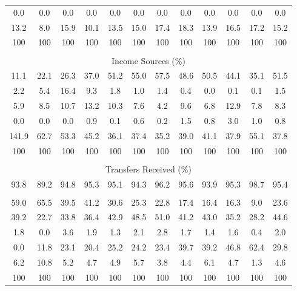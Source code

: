\begin{tabular}{c c c| c c c c c| c c c| c}
0.0 & 0.0 & 0.0 & 0.0 & 0.0 & 0.0 & 0.0 & 0.0 & 0.0 & 0.0 & 0.0 & 0.0 \\
13.2 & 8.0 & 15.9 & 10.1 & 13.5 & 15.0 & 17.4 & 18.3 & 13.9 & 16.5 & 17.2 & 15.2 \\
\midrule
100 & 100 & 100 & 100 & 100 & 100 & 100 & 100 & 100 & 100 & 100 & 100 \\
\midrule \\
\multicolumn{12}{c}{Income Sources (\%)}  \\
\midrule
11.1 & 22.1 & 26.3 & 37.0 & 51.2 & 55.0 & 57.5 & 48.6 & 50.5 & 44.1 & 35.1 & 51.5 \\
2.2 & 5.4 & 16.4 & 9.3 & 1.8 & 1.0 & 1.4 & 0.4 & 0.0 & 0.1 & 0.1 & 1.5 \\
5.9 & 8.5 & 10.7 & 13.2 & 10.3 & 7.6 & 4.2 & 9.6 & 6.8 & 12.9 & 7.8 & 8.3 \\
0.0 & 0.0 & 0.0 & 0.9 & 0.1 & 0.6 & 0.2 & 1.5 & 0.8 & 3.0 & 1.0 & 0.8 \\
141.9 & 62.7 & 53.3 & 45.2 & 36.1 & 37.4 & 35.2 & 39.0 & 41.1 & 37.9 & 55.1 & 37.8 \\
\midrule
100 & 100 & 100 & 100 & 100 & 100 & 100 & 100 & 100 & 100 & 100 & 100 \\
\midrule \\
\multicolumn{12}{c}{Transfers Received (\%)}  \\
\midrule
93.8 & 89.2 & 94.8 & 95.3 & 95.1 & 94.3 & 96.2 & 95.6 & 93.9 & 95.3 & 98.7 & 95.4 \\
 & & & & & & & & & & &  \\
59.0 & 65.5 & 39.5 & 41.2 & 30.6 & 25.3 & 22.8 & 17.4 & 16.4 & 16.3 & 9.0 & 23.6 \\
39.2 & 22.7 & 33.8 & 36.4 & 42.9 & 48.5 & 51.0 & 41.2 & 43.0 & 35.2 & 28.2 & 44.6 \\
1.8 & 0.0 & 3.6 & 1.9 & 1.3 & 2.1 & 2.8 & 1.7 & 1.4 & 1.6 & 0.4 & 2.0 \\
0.0 & 11.8 & 23.1 & 20.4 & 25.2 & 24.2 & 23.4 & 39.7 & 39.2 & 46.8 & 62.4 & 29.8 \\
6.2 & 10.8 & 5.2 & 4.7 & 4.9 & 5.7 & 3.8 & 4.4 & 6.1 & 4.7 & 1.3 & 4.6 \\
\midrule
100 & 100 & 100 & 100 & 100 & 100 & 100 & 100 & 100 & 100 & 100 & 100 \\
\bottomrule
\end{tabular}